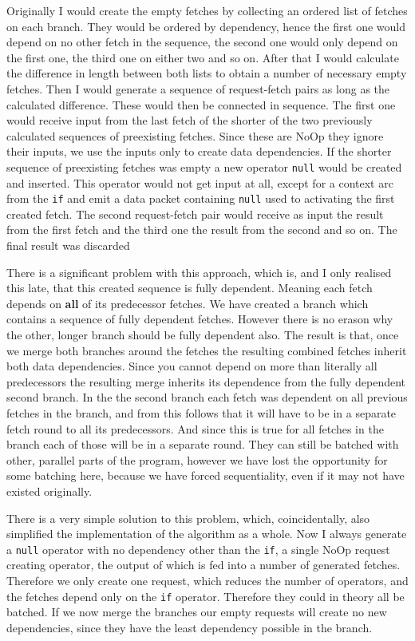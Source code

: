 Originally I would create the empty fetches by collecting an ordered list of fetches on each branch.
They would be ordered by dependency, hence the first one would depend on no other fetch in the sequence, the second one would only depend on the first one, the third one on either two and so on.
After that I would calculate the difference in length between both lists to obtain a number of necessary empty fetches.
Then I would generate a sequence of request-fetch pairs as long as the calculated difference.
These would then be connected in sequence.
The first one would receive input from the last fetch of the shorter of the two previously calculated sequences of preexisting fetches.
Since these are NoOp they ignore their inputs, we use the inputs only to create data dependencies.
If the shorter sequence of preexisting fetches was empty a new operator \texttt{null} would be created and inserted.
This operator would not get input at all, except for a context arc from the \texttt{if} and emit a data packet containing \texttt{null} used to activating the first created fetch.
The second request-fetch pair would receive as input the result from the first fetch and the third one the result from the second and so on.
The final result was discarded

There is a significant problem with this approach, which is, and I only realised this late, that this created sequence is fully dependent.
Meaning each fetch depends on \textbf{all} of its predecessor fetches.
We have created a branch which contains a sequence of fully dependent fetches.
However there is no erason why the other, longer branch should be fully dependent also.
The result is that, once we merge both branches around the fetches the resulting combined fetches inherit both data dependencies.
Since you cannot depend on more than literally all predecessors the resulting merge inherits its dependence from the fully dependent second branch.
In the the second branch each fetch was dependent on all previous fetches in the branch, and from this follows that it will have to be in a separate fetch round to all its predecessors.
And since this is true for all fetches in the branch each of those will be in a separate round.
They can still be batched with other, parallel parts of the program, however we have lost the opportunity for some batching here, because we have forced sequentiality, even if it may not have existed originally.

There is a very simple solution to this problem, which, coincidentally, also simplified the implementation of the algorithm as a whole.
Now I always generate a \texttt{null} operator with no dependency other than the \texttt{if}, a single NoOp request creating operator, the output of which is fed into a number of generated fetches.
Therefore we only create one request, which reduces the number of operators, and the fetches depend only on the \texttt{if} operator.
Therefore they could in theory all be batched.
If we now merge the branches our empty requests will create no new dependencies, since they have the least dependency possible in the branch.

